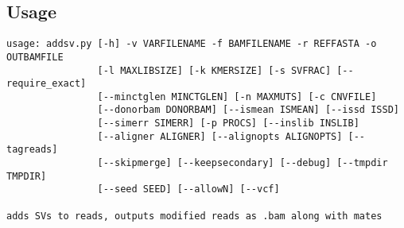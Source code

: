 \documentclass[letterpaper,11pt]{article}
\begin{document}
\subsection{Usage}
\begin{verbatim}
usage: addsv.py [-h] -v VARFILENAME -f BAMFILENAME -r REFFASTA -o OUTBAMFILE
                [-l MAXLIBSIZE] [-k KMERSIZE] [-s SVFRAC] [--require_exact]
                [--minctglen MINCTGLEN] [-n MAXMUTS] [-c CNVFILE]
                [--donorbam DONORBAM] [--ismean ISMEAN] [--issd ISSD]
                [--simerr SIMERR] [-p PROCS] [--inslib INSLIB]
                [--aligner ALIGNER] [--alignopts ALIGNOPTS] [--tagreads]
                [--skipmerge] [--keepsecondary] [--debug] [--tmpdir TMPDIR]
                [--seed SEED] [--allowN] [--vcf]

adds SVs to reads, outputs modified reads as .bam along with mates


\end{verbatim}
\end{document}
